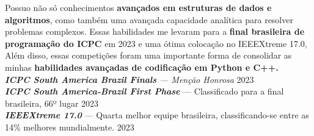 \vspace*{3pt}
Possuo não só conhecimentos \textbf{avançados em estruturas de dados e algoritmos}, como também uma avançada capacidade
analítica para resolver problemas complexos. Essas habilidades me levaram para a \textbf{final brasileira de programação do
ICPC} em 2023 e uma ótima colocação no IEEEXtreme 17.0, Além disso, essas competições foram uma importante forma de
consolidar as minhas \textbf{habilidades avançadas de codificação em Python e C++.} \\

\vspace*{7pt}
\textit{\textbf{ICPC South America Brazil Finals} --- Menção Honrosa } \hfill 2023\\
\textit{\textbf{ICPC South America-Brazil First Phase}} --- Classificado para a final brasileira, 66º lugar \hfill 2023\\
\textit{\textbf{IEEEXtreme 17.0}} --- Quarta melhor equipe brasileira, classificando-se entre as 14\% melhores mundialmente. \hfill 2023\\
